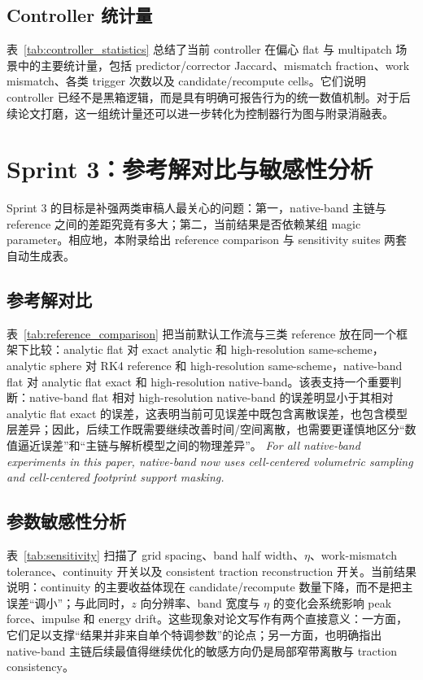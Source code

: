 \documentclass[11pt,a4paper]{ctexart}
\begin{document}
\subsection{Controller 统计量}
表~\ref{tab:controller_statistics} 总结了当前 controller 在偏心 flat 与 multipatch 场景中的主要统计量，包括 predictor/corrector Jaccard、mismatch fraction、work mismatch、各类 trigger 次数以及 candidate/recompute cells。它们说明 controller 已经不是黑箱逻辑，而是具有明确可报告行为的统一数值机制。对于后续论文打磨，这一组统计量还可以进一步转化为控制器行为图与附录消融表。



\section{Sprint 3：参考解对比与敏感性分析}
Sprint 3 的目标是补强两类审稿人最关心的问题：第一，native-band 主链与 reference 之间的差距究竟有多大；第二，当前结果是否依赖某组 magic parameter。相应地，本附录给出 reference comparison 与 sensitivity suites 两套自动生成表。

\subsection{参考解对比}
表~\ref{tab:reference_comparison} 把当前默认工作流与三类 reference 放在同一个框架下比较：analytic flat 对 exact analytic 和 high-resolution same-scheme，analytic sphere 对 RK4 reference 和 high-resolution same-scheme，native-band flat 对 analytic flat exact 和 high-resolution native-band。该表支持一个重要判断：native-band flat 相对 high-resolution native-band 的误差明显小于其相对 analytic flat exact 的误差，这表明当前可见误差中既包含离散误差，也包含模型层差异；因此，后续工作既需要继续改善时间/空间离散，也需要更谨慎地区分“数值逼近误差”和“主链与解析模型之间的物理差异”。
\noindent\textit{For all native-band experiments in this paper, native-band now uses cell-centered volumetric sampling and cell-centered footprint support masking.}



\subsection{参数敏感性分析}
表~\ref{tab:sensitivity} 扫描了 grid spacing、band half width、$\eta$、work-mismatch tolerance、continuity 开关以及 consistent traction reconstruction 开关。当前结果说明：continuity 的主要收益体现在 candidate/recompute 数量下降，而不是把主误差“调小”；与此同时，$z$ 向分辨率、band 宽度与 $\eta$ 的变化会系统影响 peak force、impulse 和 energy drift。这些现象对论文写作有两个直接意义：一方面，它们足以支撑“结果并非来自单个特调参数”的论点；另一方面，也明确指出 native-band 主链后续最值得继续优化的敏感方向仍是局部窄带离散与 traction consistency。
\end{document}
